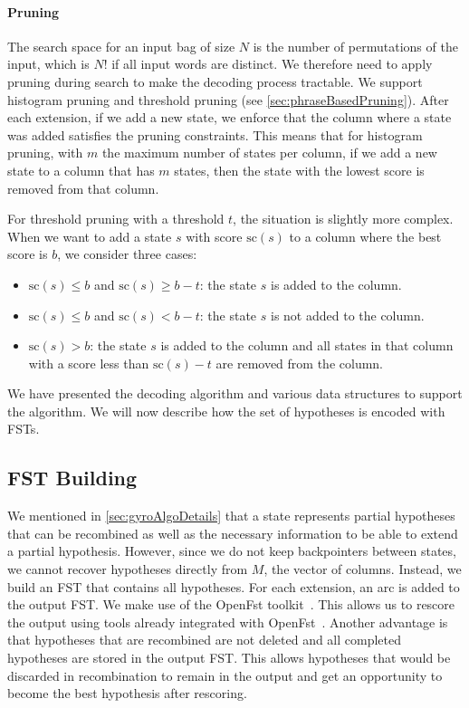 \paragraph{Pruning}
\label{sec:gyroPruningDescription}

The search space for an input bag of size $N$ is the number of permutations
of the input, which is $N!$ if all input words are distinct. We therefore need to apply
pruning during search to make the decoding process tractable.
We support histogram pruning and threshold
pruning (see \autoref{sec:phraseBasedPruning}).
After each extension, if we add a new state, we enforce that the column where
a state was added satisfies the pruning constraints. This means that for
histogram pruning, with $m$ the maximum number of states per column, if we
add a new state to a column that has $m$ states, then the state with the lowest
score is removed from that column.

For threshold pruning with a threshold $t$, the situation is
slightly more complex. When we want to add a state $s$ with score $\text{sc}(s)$ to a column where the best score
is $b$, we consider three cases:
%
\begin{itemize}
  \item $\text{sc}(s) \leq b$ and $\text{sc}(s) \geq b - t$: the state $s$ is added to the column.
  \item $\text{sc}(s) \leq b$ and $\text{sc}(s) < b - t$: the state $s$ is not added to the column.
  \item $\text{sc}(s) > b$: the state $s$ is added to the column and all states in that
    column with a score less than $\text{sc}(s) - t$ are removed from the column.
\end{itemize}

We have presented the decoding algorithm and various data structures to support
the algorithm. We will now describe how the set of hypotheses is encoded with
FSTs.

\subsection{FST Building}
\label{sec:gyroFstBuilding}

We mentioned in \autoref{sec:gyroAlgoDetails} that a state
represents partial hypotheses that can
be recombined as well as the necessary information to be able
to extend a partial hypothesis. However, since we do not keep backpointers
between states,
we cannot recover hypotheses directly from $M$, the vector of columns.
Instead, we build an FST that contains all hypotheses. For each extension,
an arc is added to the output FST. We make use of the OpenFst
toolkit~\citep{allauzen-riley-schalkwyk-skut-mohri:2007:CIAA}.
This allows us to rescore the output using tools already integrated
with OpenFst~\citep{blackwood:2010:PHD}.
Another advantage is that hypotheses that are recombined are
not deleted and all completed hypotheses are stored in the output FST.
This allows hypotheses
that would be discarded in recombination
to remain in the output and get an opportunity to become the best hypothesis
after rescoring.

